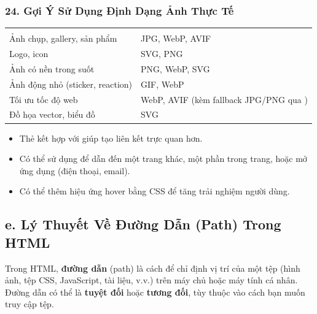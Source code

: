\subsubsection{24. Gợi Ý Sử Dụng Định Dạng Ảnh Thực Tế}

\begin{prettyTableBox}
\begin{tabularx}{\linewidth}{L{5cm} Z}
 &  \\
Ảnh chụp, gallery, sản phẩm & JPG, WebP, AVIF \\
Logo, icon & SVG, PNG \\
Ảnh có nền trong suốt & PNG, WebP, SVG \\
Ảnh động nhỏ (sticker, reaction) & GIF, WebP \\
Tối ưu tốc độ web & WebP, AVIF (kèm fallback JPG/PNG qua ) \\
Đồ họa vector, biểu đồ & SVG \\
\end{tabularx}
\end{prettyTableBox}

\begin{conceptBox}
\begin{itemize}[leftmargin=1.5em, itemsep=3pt, parsep=0pt]
    \item Thẻ  kết hợp với  giúp tạo liên kết trực quan hơn.
    \item Có thể sử dụng để dẫn đến một trang khác, một phần trong trang, hoặc mở ứng dụng (điện thoại, email).
    \item Có thể thêm hiệu ứng hover bằng CSS để tăng trải nghiệm người dùng.
\end{itemize}
\end{conceptBox}



\subsection{e. Lý Thuyết Về Đường Dẫn (Path) Trong HTML}

Trong HTML, \textbf{đường dẫn} (path) là cách để chỉ định vị trí của một tệp (hình ảnh, tệp CSS, JavaScript, tài liệu, v.v.) trên máy chủ hoặc máy tính cá nhân. Đường dẫn có thể là \textbf{tuyệt đối} hoặc \textbf{tương đối}, tùy thuộc vào cách bạn muốn truy cập tệp.

